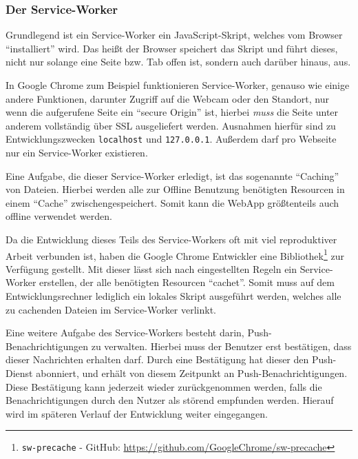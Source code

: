 \documentclass[a4paper,12pt,ngerman,listof=numbered]{scrartcl}      %
\providecommand{\inlinecode}[1]{\texttt{#1}}
\begin{document}
	\subsubsection{Der Service-Worker}
	Grundlegend ist ein Service-Worker ein JavaScript-Skript, welches vom Browser ``installiert'' wird. Das heißt der Browser speichert das Skript und führt dieses, nicht nur solange eine Seite bzw. Tab offen ist, sondern auch darüber hinaus, aus.\par
	In Google Chrome zum Beispiel funktionieren Service-Worker, genauso wie einige andere Funktionen, darunter Zugriff auf die Webcam oder den Standort, nur wenn die aufgerufene Seite ein ``secure Origin'' ist, hierbei \emph{muss} die Seite unter anderem vollständig über SSL ausgeliefert werden. Ausnahmen hierfür sind zu Entwicklungszwecken \inlinecode{localhost} und \inlinecode{127.0.0.1}. Außerdem darf pro Webseite nur ein Service-Worker existieren.\par
	Eine Aufgabe, die dieser Service-Worker erledigt, ist das sogenannte ``Caching'' von Dateien. Hierbei werden alle zur Offline Benutzung benötigten Resourcen in einem ``Cache'' zwischengespeichert. Somit kann die WebApp größtenteils auch offline verwendet werden.\par
	Da die Entwicklung dieses Teils des Service-Workers oft mit viel reproduktiver Arbeit verbunden ist, haben die Google Chrome Entwickler eine Bibliothek\footnote{\inlinecode{sw-precache} - GitHub: \url{https://github.com/GoogleChrome/sw-precache}} zur Verfügung gestellt. Mit dieser lässt sich nach eingestellten Regeln ein Service-Worker erstellen, der alle benötigten Resourcen ``cachet''. Somit muss auf dem Entwicklungsrechner lediglich ein lokales Skript ausgeführt werden, welches alle zu cachenden Dateien im Service-Worker verlinkt.\par
	Eine weitere Aufgabe des Service-Workers besteht darin, Push-Be\-nach\-rich\-ti\-gungen zu verwalten. Hierbei muss der Benutzer erst bestätigen, dass dieser Nachrichten erhalten darf. Durch eine Bestätigung hat dieser den Push-Dienst abonniert, und erhält von diesem Zeitpunkt an Push-Benachrichtigungen. Diese Bestätigung kann jederzeit wieder zurückgenommen werden, falls die Benachrichtigungen durch den Nutzer als störend empfunden werden. Hierauf wird im späteren Verlauf der Entwicklung weiter eingegangen.\par
	
\end{document}
